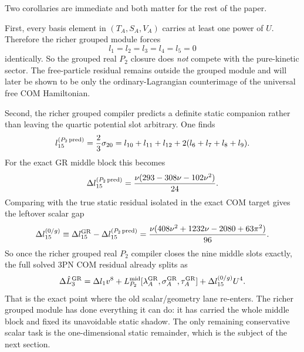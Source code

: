 \documentclass[11pt]{article}
\begin{document}
Two corollaries are immediate and both matter for the rest of the paper.

First, every basis element in \((T_A,S_A,V_A)\) carries at least one power of
\(U\).  Therefore the richer grouped module forces
\begin{equation}
l_1=l_2=l_3=l_4=l_5=0
\label{eq:grouped-no-pure-kinetic}
\end{equation}
identically.  So the grouped real $P_2$ closure does \emph{not} compete with the
pure-kinetic sector.  The free-particle residual remains outside the grouped
module and will later be shown to be only the ordinary-Lagrangian counterimage
of the universal free COM Hamiltonian.

Second, the richer grouped compiler predicts a definite static companion rather
than leaving the quartic potential slot arbitrary.  One finds
\begin{equation}
l_{15}^{(P_2\,\rm pred)}=\frac23\sigma_{20}
=l_{10}+l_{11}+l_{12}+2(l_6+l_7+l_8+l_9).
\label{eq:grouped-static-companion}
\end{equation}
For the exact GR middle block this becomes
\begin{equation}
\Delta l_{15}^{(P_2\,\rm pred)}
=\frac{\nu(293-308\nu-102\nu^2)}{24}.
\label{eq:grouped-static-prediction}
\end{equation}
Comparing with the true static residual isolated in the exact COM target gives the leftover scalar gap
\begin{equation}
\Delta l_{15}^{(0/g)}
\equiv
\Delta l_{15}^{\rm GR}-\Delta l_{15}^{(P_2\,\rm pred)}
=\frac{\nu(408\nu^2+1232\nu-2080+63\pi^2)}{96}.
\label{eq:grouped-static-gap}
\end{equation}
So once the richer grouped real $P_2$ compiler closes the nine middle slots
exactly, the full solved $3$PN COM residual already splits as
\begin{equation}
\Delta \hat L_3^{\rm GR}
=
\Delta l_1 v^8
+
L_{P_2}^{\rm mid}[\lambda_A^{\rm GR},\sigma_A^{\rm GR},\tau_A^{\rm GR}]
+
\Delta l_{15}^{(0/g)}U^4.
\label{eq:grouped-final-split}
\end{equation}
That is the exact point where the old scalar/geometry lane re-enters.  The
richer grouped module has done everything it can do: it has carried the whole
middle block and fixed its unavoidable static shadow.  The only remaining
conservative scalar task is the one-dimensional static remainder, which is the
subject of the next section.

\end{document}
